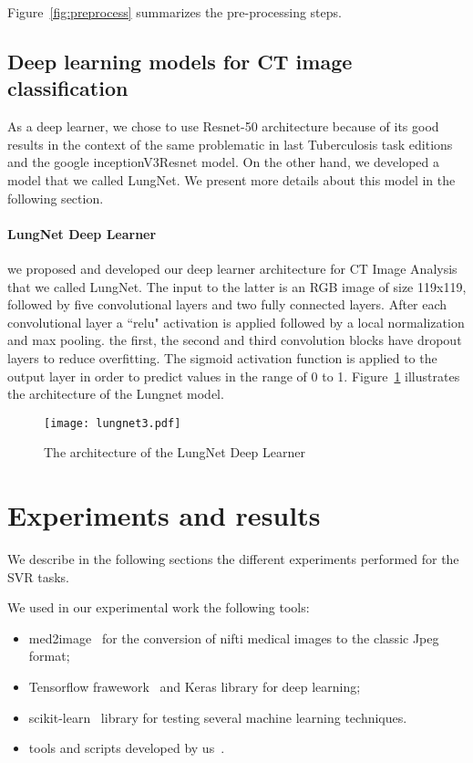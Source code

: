 Figure~\ref{fig:preprocess} summarizes the pre-processing steps.
\subsection{Deep learning models for CT image classification}
As a deep learner, we chose to use Resnet-50 architecture because of its good results in the context of the same problematic in last Tuberculosis task editions~\cite{sgeast17} and the google inceptionV3Resnet model. On the other hand, we developed a model that we called LungNet. We present more details about this model in the following section.

\paragraph{LungNet Deep Learner} we proposed and developed our deep learner architecture for CT Image Analysis that we called LungNet. The input to the latter is an RGB image of size 119x119, followed by five convolutional layers and two fully connected layers. After each convolutional layer a ``relu" activation is applied followed by a local normalization and max pooling. the first, the second and third convolution blocks have dropout layers to reduce overfitting. The sigmoid activation function is applied to the output layer in order to predict values in the range of 0 to 1. Figure~\ref{fig:lungnet} illustrates the architecture of the Lungnet model.

\begin{figure}
\center
\texttt{[image: lungnet3.pdf]}
\caption{The architecture of the LungNet Deep Learner} 
\label{fig:lungnet}
\end{figure}

\section{Experiments and results}
We describe in the following sections the different experiments performed for the SVR tasks. 

We used in our experimental work the following tools:
\begin{itemize}
\item med2image~\cite{med2image} for the conversion of nifti medical images to the classic Jpeg format;
\item Tensorflow frawework~\cite{tensorflow} and Keras library for deep learning;
\item scikit-learn~\cite{scikit-learn} library for testing several machine learning techniques.
\item tools and scripts developed by us~\cite{anouargit}.
\end{itemize}

